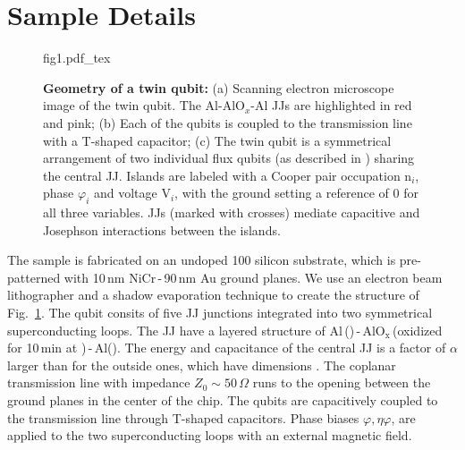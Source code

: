 \section{Sample Details}

\begin{figure}[h]
  \centering\def\svgwidth{8.5cm}{fig1.pdf_tex}
  \caption{\small  \textbf{Geometry  of a  twin  qubit:}  (a) Scanning  electron
    microscope image of the twin qubit. The Al-AlO$_x$-Al JJs are highlighted in
    red and  pink; (b) Each  of the qubits is  coupled to the  transmission line
    with a T-shaped  capacitor; (c) The twin qubit is  a symmetrical arrangement
    of two individual  flux qubits (as described  in \cite{orlando1999}) sharing
    the central  JJ.  Islands are labeled  with a Cooper pair  occupation n$_i$,
    phase $\varphi_i$ and voltage V$_i$, with the  ground setting a reference of 0 for
    all  three variables.   JJs  (marked with  crosses)  mediate capacitive  and
    Josephson  interactions between  the islands.
  }
  \label{fig:setup}
  
\end{figure}


\noindent The sample is fabricated on an undoped 100 silicon substrate, which is
pre-patterned with 10\,nm  NiCr\,-\,90\,nm Au ground planes. We  use an electron
beam lithographer and a shadow evaporation  technique to create the structure of
Fig.~\ref{fig:setup}. The qubit consits of five JJ junctions integrated into two
symmetrical  superconducting  loops.   The  JJ  have  a   layered  structure  of
Al\,()\,-\,AlO$_{\text{x}}$\,(oxidized     for      10\,min     at
)\,-\,Al().  The energy  and  capacitance of  the
central JJ  is a  factor of  $\alpha$ larger than  for the  outside ones,  which have
dimensions  .    The  coplanar  transmission   line  with
impedance $ Z_{0} \sim 50\,\Omega $ runs to the opening between the ground planes in the
center of the chip. The qubits are capacitively coupled to the transmission line
through T-shaped  capacitors.  Phase  biases $\varphi,  \eta \varphi$, are  applied to  the two
superconducting loops with an external magnetic field.


